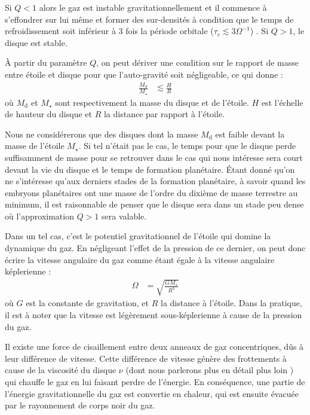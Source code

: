 Si $Q<1$ alors le gaz est instable gravitationnellement et il commence à s'effondrer sur lui même et former des sur-densités à condition que le temps de refroidissement soit inférieur à 3 fois la période orbitale ($\tau_c \lesssim 3 \Omega^{-1}$) \citep{gammie2001nonlinear}.
Si $Q>1$, le disque est stable.


À partir du paramètre $Q$, on peut dériver une condition sur le rapport de masse entre étoile et disque pour que l'auto-gravité soit négligeable, ce qui donne \citep{gammie2001nonlinear} : 
\begin{align}
\frac{M_\text{d}}{M_\star} &\lesssim \frac{H}{R}
\end{align}
où $M_\text{d}$ et $M_\star$ sont respectivement la masse du disque et de l'étoile. $H$ est l'échelle de hauteur du disque et $R$ la distance par rapport à l'étoile.

Nous ne considérerons que des disques dont la masse $M_\text{d}$ est faible devant la masse de l'étoile $M_\star$. Si tel n'était pas le cas, le temps pour que le disque perde suffisamment de masse pour se retrouver dans le cas qui nous intéresse sera court devant la vie du disque et le temps de formation planétaire. Étant donné qu'on ne s'intéresse qu'aux derniers stades de la formation planétaire, à savoir quand les embryons planétaires ont une masse de l'ordre du dixième de masse terrestre au minimum, il est raisonnable de penser que le disque sera dans un stade peu dense où l'approximation $Q>1$ sera valable.

Dans un tel cas, c'est le potentiel gravitationnel de l'étoile qui domine la dynamique du gaz. En négligeant l'effet de la pression de ce dernier, on peut donc écrire la vitesse angulaire du gaz comme étant égale à la vitesse angulaire képlerienne : 
\begin{align}
\Omega &= \sqrt{\frac{GM_\star}{R^3}}
\end{align}
où $G$ est la constante de gravitation, et $R$ la distance à l'étoile. Dans la pratique, il est à noter que la vitesse est légèrement sous-képlerienne à cause de la pression du gaz. 

\bigskip

Il existe une force de cisaillement entre deux anneaux de gaz concentriques, dûs à leur différence de vitesse. Cette différence de vitesse génère des frottements à cause de la viscosité du disque $\nu$ (dont nous parlerons plus en détail plus loin ) qui chauffe le gaz en lui faisant perdre de l'énergie. En conséquence, une partie de l'énergie gravitationnelle du gaz est convertie en chaleur, qui est ensuite évacuée par le rayonnement de corps noir du gaz. 

